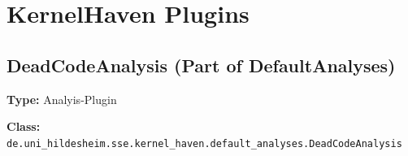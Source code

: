 \chapter{KernelHaven Plugins}\label{plugins}












%        


\section{DeadCodeAnalysis (Part of DefaultAnalyses)}

\textbf{Type:}  Analyis-Plugin

\textbf{Class:} \texttt{de.uni\_hildesheim.sse.kernel\_haven.default\_analyses.DeadCodeAnalysis}

